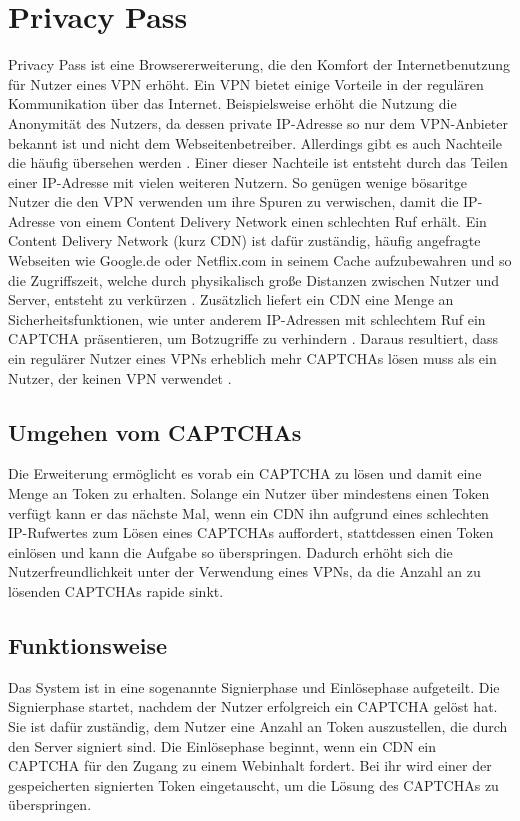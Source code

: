 \documentclass{scrreprt}
\begin{document}
\section{Privacy Pass}
\label{sec:privacy-pass}
Privacy Pass ist eine Browsererweiterung, die den Komfort der Internetbenutzung für Nutzer eines VPN erhöht. Ein VPN bietet einige Vorteile in der regulären Kommunikation über das Internet. Beispielsweise erhöht die Nutzung die Anonymität des Nutzers, da dessen private IP-Adresse so nur dem VPN-Anbieter bekannt ist und nicht dem Webseitenbetreiber. Allerdings gibt es auch Nachteile die häufig übersehen werden \cite{pp-Abbas2023Security}. Einer dieser Nachteile ist entsteht durch das Teilen einer IP-Adresse mit vielen weiteren Nutzern. So genügen wenige bösaritge Nutzer die den VPN verwenden um ihre Spuren zu verwischen, damit die IP-Adresse von einem Content Delivery Network einen schlechten Ruf erhält. Ein Content Delivery Network (kurz CDN) ist dafür zuständig, häufig angefragte Webseiten wie Google.de oder Netflix.com in seinem Cache aufzubewahren und so die Zugriffszeit, welche durch physikalisch große Distanzen zwischen Nutzer und Server, entsteht zu verkürzen \cite{pp-cdn}. Zusätzlich liefert ein CDN eine Menge an Sicherheitsfunktionen, wie unter anderem IP-Adressen mit schlechtem Ruf ein CAPTCHA präsentieren, um Botzugriffe zu verhindern \cite{pp-Ghaznavi2021Content}. Daraus resultiert, dass ein regulärer Nutzer eines VPNs erheblich mehr CAPTCHAs lösen muss als ein Nutzer, der keinen VPN verwendet \cite{pp-davidson2018privacy}.

\subsection{Umgehen vom CAPTCHAs}
Die Erweiterung ermöglicht es vorab ein CAPTCHA zu lösen und damit eine Menge an Token zu erhalten. Solange ein Nutzer über mindestens einen Token verfügt kann er das nächste Mal, wenn ein CDN ihn aufgrund eines schlechten IP-Rufwertes zum Lösen eines CAPTCHAs auffordert, stattdessen einen Token einlösen und kann die Aufgabe so überspringen. Dadurch erhöht sich die Nutzerfreundlichkeit unter der Verwendung eines VPNs, da die Anzahl an zu lösenden CAPTCHAs rapide sinkt. \cite{pp-davidson2018privacy}

\subsection{Funktionsweise}
Das System ist in eine sogenannte Signierphase und Einlösephase aufgeteilt. Die Signierphase startet, nachdem der Nutzer erfolgreich ein CAPTCHA gelöst hat. Sie ist dafür zuständig, dem Nutzer eine Anzahl an Token auszustellen, die durch den Server signiert sind. Die Einlösephase beginnt, wenn ein CDN ein CAPTCHA für den Zugang zu einem Webinhalt fordert. Bei ihr wird einer der gespeicherten signierten Token eingetauscht, um die Lösung des CAPTCHAs zu überspringen. 
\end{document}
